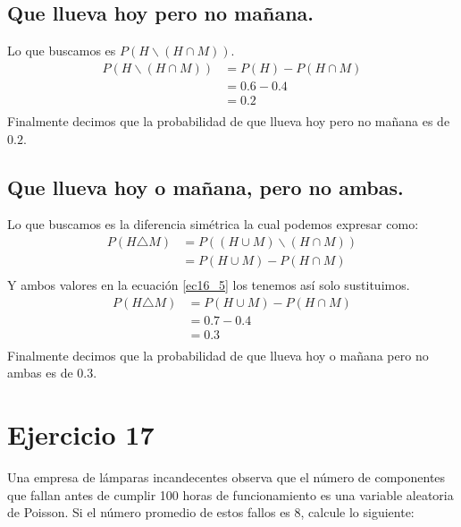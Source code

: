 \documentclass[12pt]{article}
\begin{document}
\subsection{Que llueva hoy pero no mañana.}
Lo que buscamos es $P(H\backslash (H\cap M))$.
\begin{equation}\label{ec16_3}
\begin{split}
P(H\backslash (H\cap M)) &= P(H) - P(H\cap M)\\
&= 0.6 - 0.4\\
&= 0.2\\
\end{split}
\end{equation}
Finalmente decimos que la probabilidad de que llueva hoy pero no mañana es de $0.2$.
\subsection{Que llueva hoy o mañana, pero no ambas.}
Lo que buscamos es la diferencia simétrica la cual podemos expresar como:
\begin{equation}\label{ec16_5}
\begin{split}
P(H\triangle M) &= P((H\cup M) \backslash (H\cap M))\\
&= P(H\cup M) - P(H\cap M)\\
\end{split}
\end{equation}
Y ambos valores en la ecuación \ref{ec16_5} los tenemos así solo sustituimos.
\begin{equation}\label{ec16_6}
\begin{split}
P(H\triangle M) &= P(H\cup M) - P(H\cap M)\\
&= 0.7 - 0.4\\
&= 0.3\\
\end{split}
\end{equation}
Finalmente decimos que la probabilidad de que llueva hoy o mañana pero no ambas es de $0.3$. 
\section{Ejercicio 17}
Una empresa de lámparas incandecentes observa que el número de componentes que fallan
antes de cumplir 100 horas de funcionamiento es una variable aleatoria de Poisson. Si el
número promedio de estos fallos es 8, calcule lo siguiente:
\end{document}

